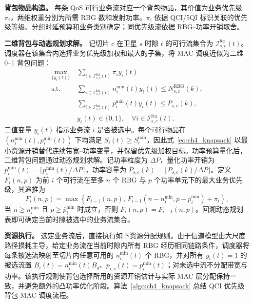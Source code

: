 \textbf{背包物品构造。} 每条 QoS 可行业务流对应一个背包物品，其价值为业务优先级 $\pi_i$，两维权重分别为所需 RBG 数和发射功率。$\pi_i$ 依据 QCI/5QI 标识关联的优先级等级、分组时延预算和业务类别确定；同优先级流依据 RBG--功率开销取舍。

\textbf{二维背包与动态规划求解。} 记切片 $c$ 在卫星 $s$ 时隙 $t$ 的可行流集合为 $\mathcal I_{s,c}^{\mathrm{fea}}(t)$。调度器在该集合内选择业务优先级加权和最大的子集，将 MAC 调度近似为二维 0--1 背包问题：
\begin{equation}\label{eq:ch4_knapsack}
\begin{aligned}
\max_{\{y_i(t)\}}\ &\sum_{i\in\mathcal I_{s,c}^{\mathrm{fea}}(t)}\pi_iy_i(t)\\
\text{s.t.}\ &\sum_{i\in\mathcal I_{s,c}^{\mathrm{fea}}(t)}n_i^{\min}(t)y_i(t)\le N_{s,c}^{\mathrm{RBG}}(k),\\
&\sum_{i\in\mathcal I_{s,c}^{\mathrm{fea}}(t)}p_i^{\min}(t)y_i(t)\le P_{s,c}(k),\\
&y_i(t)\in\{0,1\},\quad\forall i\in\mathcal I_{s,c}^{\mathrm{fea}}(t).
\end{aligned}
\end{equation}
二值变量 $y_i(t)$ 指示业务流 $i$ 是否被选中。每个可行物品在 $(n_i^{\min}(t),p_i^{\min}(t))$ 下均满足 $S_i(t)\ge S_i^{\min}$，因此式~\eqref{eq:ch4_knapsack} 以最小资源开销替代连续带宽--功率变量，并保留优先级加权目标。功率预算量化后，二维背包问题通过动态规划求解。记功率粒度为 $\Delta P$，量化功率开销为 $\bar p_i^{\min}(t)=\lceil p_i^{\min}(t)/\Delta P\rceil$，功率容量为 $\bar P_{s,c}(k)=\lfloor P_{s,c}(k)/\Delta P\rfloor$。定义 $F_i(n,p)$ 为前 $i$ 个可行流在至多 $n$ 个 RBG 与 $p$ 个功率单元下的最大业务优先级，其递推为
\begin{equation}\label{eq:ch4_dp}
F_i(n,p)=\max\left\{F_{i-1}(n,p),\,F_{i-1}\!\left(n-n_i^{\min},p-\bar p_i^{\min}\right)+\pi_i\right\},
\end{equation}
当 $n\ge n_i^{\min}$ 且 $p\ge\bar p_i^{\min}$ 时成立，否则 $F_i(n,p)=F_{i-1}(n,p)$。回溯动态规划表即可确定当前时隙被选中的业务流集合。

\textbf{资源执行。} 选定业务流后，直接执行如下资源分配规则。由于信道模型由大尺度路径损耗主导，给定业务流在当前时隙内所有 RBG 经历相同链路条件，调度器将每条被选流映射至切片内任意可用的 $n_i^{\min}(t)$ 个 RBG，并对所有 $y_i(t)=1$ 的被选流置 $B_i(t)=n_i^{\min}(t)B_g$、$p_{i,s}(t)=p_i^{\min}(t)$；对未选中流不分配带宽与功率。该执行规则使背包选择所用的资源开销估计与实际 MAC 层分配保持一致，并避免额外的凸功率优化阶段。算法~\ref{algo:ch4_knapsack} 总结 QCI 优先级背包 MAC 调度流程。

